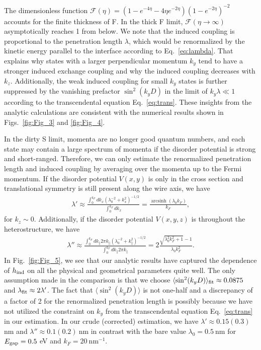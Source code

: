 \documentclass[aps,prl,twocolumn,superscriptaddress,showpacs,longbibliography]{revtex4-1}
\DeclareMathOperator\arcsinh{arcsinh}
\begin{document}
The dimensionless function $\mathcal{F}(\eta) = ( 1 - e^{-4\eta} - 4\eta e^{-2\eta}) ( 1 - e^{-2\eta} )^{-2} $  accounts for the finite thickness of F. 
In the thick F limit, $\mathcal{F}(\eta \to \infty)$ asymptotically reaches 1 from below. 
We note that the induced coupling is proportional to the penetration length $\lambda$, which would be renormalized by the kinetic energy parallel to the interface according to Eq.~\eqref{eq:lambda}.
That explains why states with a larger perpendicular momentum $k_y$ tend to have a stronger induced exchange coupling and why the induced coupling decreases with $k_z$.
Additionally, the weak induced coupling for small $k_y$ states is further suppressed by the vanishing prefactor $ \sin^2 (k_y D)$ in the limit of $k_y \lambda \ll 1$ according to the transcendental equation Eq.~\eqref{eq:trans}.
These insights from the analytic calculations are consistent with the numerical results shown in Figs.~\ref{fig:Fig_3} and \ref{fig:Fig_4}.


In the dirty S limit, momenta are no longer good quantum numbers, and each state may contain a large spectrum of momenta if the disorder potential is strong and short-ranged. 
Therefore, we can only estimate the renormalized penetration length and induced coupling by averaging over the momenta up to the Fermi momentum. If the disorder potential $V(x,y)$ is only in the cross section and translational symmetry is still present along the wire axis, we have
\begin{align}
\lambda' \approx \frac{\int^{k_F}_0 dk_x (\lambda^{-2}_0 + k^2_x )^{-1/2} }{\int^{k_F}_0 dk_x}  = \frac{ \arcsinh (\lambda_0 k_F)}{k_F},
\label{eq:lambda_prime}
\end{align}
for $k_z \sim 0$. Additionally, if the disorder potential $V(x,y,z)$ is throughout the heterostructure, we have
\begin{align}
\lambda'' \approx \frac{ \int^{k_F}_0 dk_{\parallel} 2\pi k_{\parallel} (\lambda^{-2}_0 + k^2_{\parallel})^{-1/2} }{\int^{k_F}_0 dk_{\parallel} 2\pi k_{\parallel} }    = 2 \frac{ \sqrt{\lambda^2_0 k^2_F+1 } -1 }{\lambda_0 k^2_F}.
\end{align}
In Fig.~\ref{fig:Fig_5}, we see that our analytic results have captured the dependence of $h_{\rm{ind}}$ on all the physical and geometrical parameters quite well.
The only assumption made in the comparison is that we choose $\langle \sin^2 (k_y D) \rangle_{\rm{fit}} \approx 0.0875$ and $\lambda_{\rm{fit}} \approx 2\lambda'$.
The fact that $\langle \sin^2 (k_y D) \rangle $ is not one-half and a discrepancy of a factor of 2 for the renormalized penetration length is possibly because we have not utilized the constraint on $k_y$ from the transcendental equation Eq.~\eqref{eq:trans} in our estimation. 
In our crude (corrected) estimation, we have $\lambda' \approx 0.15(0.3)~$nm and  $\lambda'' \approx 0.1(0.2)~$nm in contrast with the bare value $\lambda_0 = 0.5~$nm for $E_{\rm{gap}}=0.5~$eV and $k_F=20~\text{nm}^{-1}$.
\end{document}
